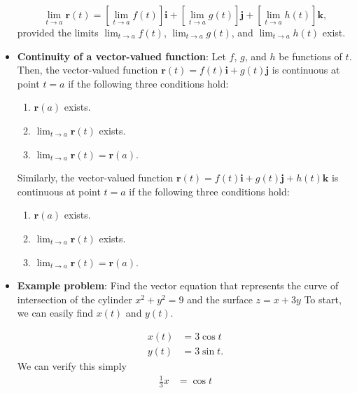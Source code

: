 \documentclass{report}
\begin{document}
\begin{itemize}
            \[
                \lim_{t \to a} \mathbf{r}(t) = \left[ \lim_{t \to a} f(t) \right]\mathbf{i} + \left[ \lim_{t \to a} g(t) \right]\mathbf{j} + \left[ \lim_{t \to a} h(t) \right]\mathbf{k},
            \]
            provided the limits  \(\lim_{t \to a} f(t)\), \(\lim_{t \to a} g(t)\), and \(\lim_{t \to a} h(t)\) exist.
        \item \textbf{Continuity of a vector-valued function}:
            Let \(f\), \(g\), and \(h\) be functions of \(t\). Then, the vector-valued function \(\mathbf{r}(t) = f(t)\mathbf{i} + g(t)\mathbf{j}\) is continuous at point \(t = a\) if the following three conditions hold:
            \begin{enumerate}
                \item \(\mathbf{r}(a)\) exists.
                \item \(\lim_{t \to a} \mathbf{r}(t)\) exists.
                \item \(\lim_{t \to a} \mathbf{r}(t) = \mathbf{r}(a)\).
            \end{enumerate}
            \bigbreak \noindent 
            Similarly, the vector-valued function \(\mathbf{r}(t) = f(t)\mathbf{i} + g(t)\mathbf{j} + h(t)\mathbf{k}\) is continuous at point \(t = a\) if the following three conditions hold:
            \begin{enumerate}
                \item \(\mathbf{r}(a)\) exists.
                \item \(\lim_{t \to a} \mathbf{r}(t)\) exists.
                \item \(\lim_{t \to a} \mathbf{r}(t) = \mathbf{r}(a)\).
            \end{enumerate}
        \item \textbf{Example problem}: Find the vector equation that represents the curve of intersection of the cylinder $x^{2} + y^{2}  = 9 $ and the surface  $z=x+3y$
            \bigbreak \noindent 
            To start, we can easily find $x(t)$ and $y(t)$. 
            \bigbreak \noindent 
            \begin{prop}
               \begin{align*}
                   x(t) &= 3\cos{t} \\
                   y(t) &= 3\sin{t}
               .\end{align*} 
               We can verify this simply
               \begin{align*}
                   \frac{1}{3}x &= \cos{t} \\

\end{align*}
\end{prop}
\end{itemize}
\end{document}

